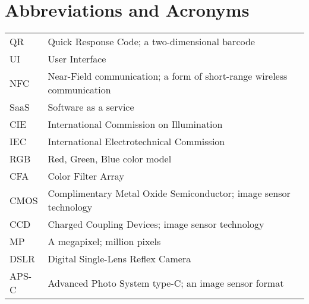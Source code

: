 \documentclass[thesis.tex]{subfiles}
\begin{document}
\chapter*{Abbreviations and Acronyms}

\noindent
\begin{longtable}{@{}p{}p{}@{}}
QR & Quick Response Code; a two-dimensional barcode \\
UI & User Interface \\
NFC & Near-Field communication; a form of short-range wireless communication \\
SaaS & Software as a service \\
CIE & International Commission on Illumination \\
IEC & International Electrotechnical Commission \\
RGB & Red, Green, Blue color model \\
CFA & Color Filter Array \\
CMOS & Complimentary Metal Oxide Semiconductor; image sensor technology \\
CCD & Charged Coupling Devices; image sensor technology \\
MP & A megapixel; million pixels \\
DSLR & Digital Single-Lens Reflex Camera \\
APS-C & Advanced Photo System type-C; an image sensor format

\end{longtable}
\end{document}
